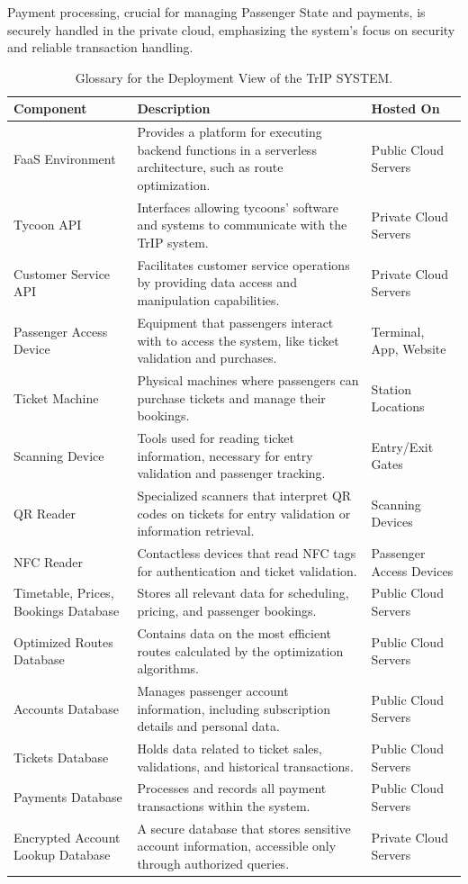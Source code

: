Payment processing, crucial for managing Passenger State and payments, is securely handled in the private cloud, emphasizing the system's focus on security and reliable transaction handling. 


\begin{table}[H]
    \centering
    \caption{Glossary for the Deployment View of the TrIP SYSTEM.}
    \label{tab:deployment_view_glossary}
    \begin{tabularx}{\textwidth}{@{}lXX@{}} %
    \toprule
    \textbf{Component} & \textbf{Description} & \textbf{Hosted On} \\
    \midrule
    FaaS Environment & Provides a platform for executing backend functions in a serverless architecture, such as route optimization. & Public Cloud Servers \\
    Tycoon API & Interfaces allowing tycoons' software and systems to communicate with the TrIP system. & Private Cloud Servers \\
    Customer Service API & Facilitates customer service operations by providing data access and manipulation capabilities. & Private Cloud Servers \\
    Passenger Access Device & Equipment that passengers interact with to access the system, like ticket validation and purchases. & Terminal, App, Website \\
    Ticket Machine & Physical machines where passengers can purchase tickets and manage their bookings. & Station Locations \\
    Scanning Device & Tools used for reading ticket information, necessary for entry validation and passenger tracking. & Entry/Exit Gates \\
    QR Reader & Specialized scanners that interpret QR codes on tickets for entry validation or information retrieval. & Scanning Devices \\
    NFC Reader & Contactless devices that read NFC tags for authentication and ticket validation. & Passenger Access Devices \\
    Timetable, Prices, Bookings Database & Stores all relevant data for scheduling, pricing, and passenger bookings. & Public Cloud Servers \\
    Optimized Routes Database & Contains data on the most efficient routes calculated by the optimization algorithms. & Public Cloud Servers \\
    Accounts Database & Manages passenger account information, including subscription details and personal data. & Public Cloud Servers \\
    Tickets Database & Holds data related to ticket sales, validations, and historical transactions. & Public Cloud Servers \\
    Payments Database & Processes and records all payment transactions within the system. & Public Cloud Servers \\
    Encrypted Account Lookup Database & A secure database that stores sensitive account information, accessible only through authorized queries. & Private Cloud Servers \\
    \bottomrule
    \end{tabularx}
\end{table}

